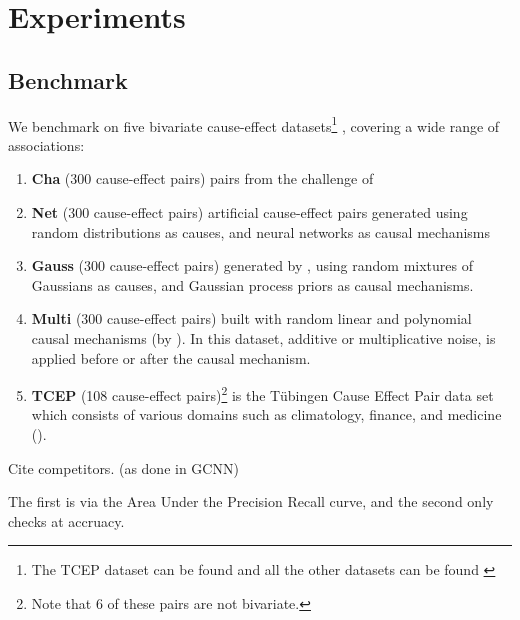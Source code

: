 \chapter{Experiments}


\section{Benchmark}

We benchmark on five bivariate cause-effect datasets\footnote{ The TCEP dataset 
can be found \href{https://webdav.tuebingen.mpg.de/cause-effect/}{\color{blue}{here}} and 
all the other datasets can be found 
\href{https://dataverse.harvard.edu/dataset.xhtml?persistentId=doi:10.7910/DVN/3757KX}{\color{blue}{here}}
}
, covering a wide range of associations:

\begin{enumerate}[noitemsep, topsep=0pt]

    \item \textbf{Cha} (300 cause-effect pairs) pairs from the challenge of \cite{chalearn}
    \item \textbf{Net} (300 cause-effect pairs) artificial cause-effect pairs generated using 
            random distributions as causes, and neural networks as causal mechanisms
    \item \textbf{Gauss} (300 cause-effect pairs) generated by \cite{Mooij2016jmlr}, using random 
      mixtures of Gaussians as causes, and Gaussian process priors as causal mechanisms.
    \item \textbf{Multi} (300 cause-effect pairs) built with random linear and 
    polynomial causal mechanisms (by \cite{goudet2017causal}). In this dataset, 
    additive or multiplicative noise, is applied before or after the causal mechanism.
    \item \textbf{TCEP} (108 cause-effect pairs)\footnote{Note that 6 of these pairs are not bivariate.} 
     is the Tübingen Cause Effect Pair data set which consists of various 
    domains such as climatology, finance, and medicine (\cite{Mooij2016jmlr}).

\end{enumerate}

Cite competitors. (as done in GCNN)

The first is via the Area Under the Precision Recall curve, and the second 
only checks at accruacy. 

